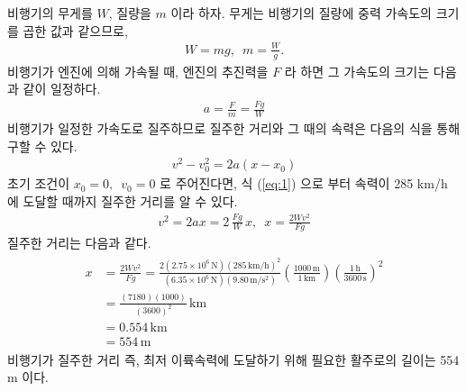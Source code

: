 \documentclass[floatfix,nofootinbib,superscriptaddress,fleqn,preprint]{revtex4}
\begin{document}
 비행기의 무게를 $W$, 질량을 $m$ 이라 하자. 
무게는 비행기의 질량에 중력 가속도의 크기를
곱한 값과 같으므로,
\begin{align}
  W=mg,\,\,\,m=\frac{W}{g}.
\end{align}
비행기가 엔진에 의해 가속될 때, 엔진의 추진력을 $F$ 라 하면 
그 가속도의 크기는 다음과 같이 일정하다.
\begin{align}
  a=\frac{F}{m}=\frac{Fg}{W}
\end{align}
비행기가 일정한 가속도로 질주하므로 질주한 거리와 그 때의 속력은 
다음의 식을 통해 구할 수 있다.
\begin{align}\label{eq:1}
 v^2-v^2_0 = 2a(x-x_0) 
\end{align}
초기 조건이 $x_0=0,\,\,\,v_0=0$ 로 주어진다면, 식 (\ref{eq:1}) 으로
부터 속력이 285 km/h 에 도달할 때까지 질주한 거리를 알 수 있다.
\begin{align}
    v^2 = 2ax = 2\,\frac{Fg}{W}\,x,\,\,\,
    x=\frac{2Wv^2}{Fg}
\end{align}
질주한 거리는 다음과 같다.
\begin{align}
  \begin{split}
    x&=\frac{2Wv^2}{Fg}
    =\frac{2(2.75\times 10^6\,\mathrm{N}){(285\,\mathrm{km/h})}^2}
    {(6.35\times 10^6\,\mathrm{N})(9.80\,\mathrm{m/s^2})}
    \left(\frac{1000\,\mathrm{m}}{1\,\mathrm{km}}\right)
    \left(\frac{1\,\mathrm{h}}{3600\,\mathrm{s}}\right)^2 \\
    &=\frac{(7180)(1000)}{(3600)^2}\,\mathrm{km}  \\
    &=0.554\,\mathrm{km} \\
    &= 554\,\mathrm{m}
  \end{split}
\end{align}
비행기가 질주한 거리 즉, 최저 이륙속력에 도달하기 위해 필요한 
활주로의 길이는 554 m 이다.

\vspace{2cm}
\end{document}
